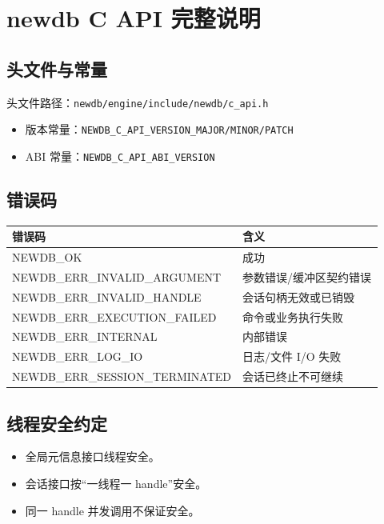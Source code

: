 \documentclass[11pt,a4paper]{ctexart}
\begin{document}
\section{newdb C API 完整说明}
\subsection{头文件与常量}
头文件路径：\texttt{newdb/engine/include/newdb/c\_api.h}
\begin{itemize}
  \item 版本常量：\texttt{NEWDB\_C\_API\_VERSION\_MAJOR/MINOR/PATCH}
  \item ABI 常量：\texttt{NEWDB\_C\_API\_ABI\_VERSION}
\end{itemize}

\subsection{错误码}
\begin{longtable}{>{\ttfamily}p{0.36\linewidth}p{0.56\linewidth}}
\toprule
错误码 & 含义 \\
\midrule
NEWDB\_OK & 成功 \\
NEWDB\_ERR\_INVALID\_ARGUMENT & 参数错误/缓冲区契约错误 \\
NEWDB\_ERR\_INVALID\_HANDLE & 会话句柄无效或已销毁 \\
NEWDB\_ERR\_EXECUTION\_FAILED & 命令或业务执行失败 \\
NEWDB\_ERR\_INTERNAL & 内部错误 \\
NEWDB\_ERR\_LOG\_IO & 日志/文件 I/O 失败 \\
NEWDB\_ERR\_SESSION\_TERMINATED & 会话已终止不可继续 \\
\bottomrule
\end{longtable}

\subsection{线程安全约定}
\begin{itemize}
  \item 全局元信息接口线程安全。
  \item 会话接口按“一线程一 handle”安全。
  \item 同一 handle 并发调用不保证安全。
\end{itemize}
\end{document}

